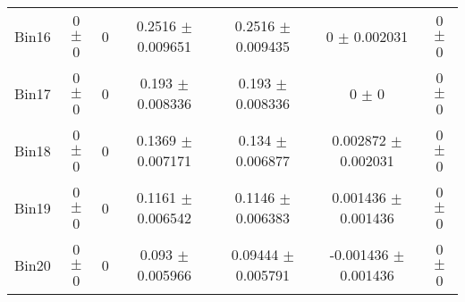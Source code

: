 \begin{tabular}{@{\extracolsep{4pt}}lcccccc@{}}
     Bin16 & 0 $\pm$ 0 & 0 & 0.2516 $\pm$ 0.009651 & 0.2516 $\pm$ 0.009435 & 0 $\pm$ 0.002031 & 0 $\pm$ 0 \\ 
     Bin17 & 0 $\pm$ 0 & 0 & 0.193 $\pm$ 0.008336 & 0.193 $\pm$ 0.008336 & 0 $\pm$ 0 & 0 $\pm$ 0 \\ 
     Bin18 & 0 $\pm$ 0 & 0 & 0.1369 $\pm$ 0.007171 & 0.134 $\pm$ 0.006877 & 0.002872 $\pm$ 0.002031 & 0 $\pm$ 0 \\ 
     Bin19 & 0 $\pm$ 0 & 0 & 0.1161 $\pm$ 0.006542 & 0.1146 $\pm$ 0.006383 & 0.001436 $\pm$ 0.001436 & 0 $\pm$ 0 \\ 
     Bin20 & 0 $\pm$ 0 & 0 & 0.093 $\pm$ 0.005966 & 0.09444 $\pm$ 0.005791 & -0.001436 $\pm$ 0.001436 & 0 $\pm$ 0 \\ 
\hline\hline
  \end{tabular}
